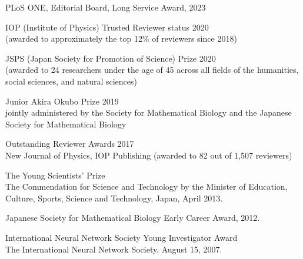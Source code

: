 \documentclass[11pt,letter]{article}
\renewenvironment{itemize}{
  \begin{list}{}{
    \setlength{\leftmargin}{1.5em}
    \setlength{\itemsep}{0.25em}
    \setlength{\parskip}{0pt}
    \setlength{\parsep}{0.25em}
  }
}{
  \end{list}
}
\begin{document}
\begin{itemize}


\item PLoS ONE, Editorial Board, Long Service Award, 2023

\item IOP (Institute of Physics) Trusted Reviewer status 2020\\
(awarded to approximately the top 12\% of reviewers since 2018)

\item JSPS (Japan Society for Promotion of Science) Prize 2020\\
(awarded to 24 researchers under the age of 45 across all fields of the humanities, social sciences, and natural sciences)

\item Junior Akira Okubo Prize 2019\\
jointly administered by the Society for Mathematical Biology and the Japanese Society for Mathematical Biology

\item Outstanding Reviewer Awards 2017\\
New Journal of Physics, IOP Publishing (awarded to 82 out of 1,507 reviewers)

%
%

\item The Young Scientists' Prize\\
The Commendation for Science and Technology by the Minister of Education, Culture, Sports, Science and Technology, Japan, April 2013.

\item
Japanese Society for Mathematical Biology Early Career Award, 2012.

\item International Neural Network Society Young Investigator Award\\
The International Neural Network Society, August 15, 2007.

\end{itemize}
\end{document}
